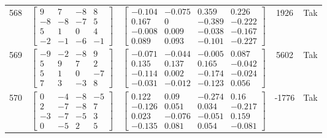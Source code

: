 \documentclass[a4paper,12pt]{article}
\begin{document}
\begin{tabular}{c c c c c}
568
&
$\begin{bmatrix} 9 & 7 & -8 & 8 \\ -8 & -8 & -7 & 5 \\ 5 & 1 & 0 & 4 \\ -2 & -1 & -6 & -1 \end{bmatrix}$
&
$\begin{bmatrix} -0.104 & -0.075 & 0.359 & 0.226 \\ 0.167 & 0 & -0.389 & -0.222 \\ -0.008 & 0.009 & -0.038 & -0.167 \\ 0.089 & 0.093 & -0.101 & -0.227 \end{bmatrix}$
&
1926
&
Tak
\\
569
&
$\begin{bmatrix} -9 & -2 & -8 & 9 \\ 5 & 9 & 7 & 2 \\ 5 & 1 & 0 & -7 \\ 7 & 3 & -3 & 8 \end{bmatrix}$
&
$\begin{bmatrix} -0.071 & -0.044 & -0.005 & 0.087 \\ 0.135 & 0.137 & 0.165 & -0.042 \\ -0.114 & 0.002 & -0.174 & -0.024 \\ -0.031 & -0.012 & -0.123 & 0.056 \end{bmatrix}$
&
5602
&
Tak
\\
570
&
$\begin{bmatrix} 0 & -4 & -8 & -5 \\ 2 & -7 & -8 & 7 \\ -3 & -7 & -5 & 3 \\ 0 & -5 & 2 & 5 \end{bmatrix}$
&
$\begin{bmatrix} 0.122 & 0.09 & -0.274 & 0.16 \\ -0.126 & 0.051 & 0.034 & -0.217 \\ 0.023 & -0.076 & -0.051 & 0.159 \\ -0.135 & 0.081 & 0.054 & -0.081 \end{bmatrix}$
&
-1776
&
Tak
\\
\end{tabular} \egroup \newpage
\end{document}
